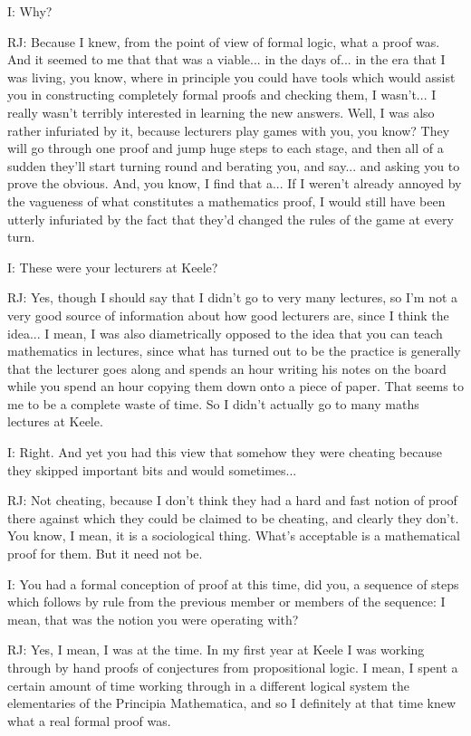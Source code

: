 \documentclass[10pt,titlepage]{book}
\begin{document}
I: Why?

RJ: Because I knew, from the point of view of formal logic, what a proof was. And it seemed to me that that was a viable... in the days of... in the era that I was living, you know, where in principle you could have tools which would assist you in constructing completely formal proofs and checking them, I wasn't... I really wasn't 
terribly interested in learning the new answers. Well, I was also rather infuriated by it, because lecturers play games with you, you know? They will go through one proof and jump huge steps to each stage, and then all of a sudden they'll start turning round and berating you, and say... and asking you to prove the obvious. And, you know, I find that a... If I weren't already annoyed by the vagueness of what constitutes a mathematics proof, I would still have been utterly infuriated by the fact that they'd changed the rules of the game at every turn.

I: These were your lecturers at Keele?

RJ: Yes, though I should say that I didn't go to very many lectures, so I'm not a very good source of information about how good lecturers are, since I think the idea... I mean, I was also diametrically opposed to the idea that you can teach mathematics in lectures, since what has turned out to be the practice is generally that the lecturer goes along and spends an hour writing his notes on the board while you spend an hour copying them down onto a piece of paper. That seems to me to be a complete waste of time. So I didn't actually go to many maths lectures at Keele.

I: Right. And yet you had this view that somehow they were cheating because they skipped important bits and would sometimes...

RJ: Not cheating, because I don't think they had a hard and fast notion of proof there against which they could be claimed to be cheating, and clearly they don't. You know, I mean, it is a sociological thing. What's acceptable is a mathematical proof for them. But it need not be.

I: You had a formal conception of proof at this time, did you, a sequence of steps which follows by rule from the previous member or members of the sequence: I mean, that was the notion you were operating with?

RJ: Yes, I mean, I was at the time. In my first year at Keele I was working through by hand proofs of conjectures from propositional logic. I mean, I spent a certain amount of time working through in a different logical system the elementaries of the Principia Mathematica, and so I definitely at that time knew what a real formal proof was.
\end{document}
